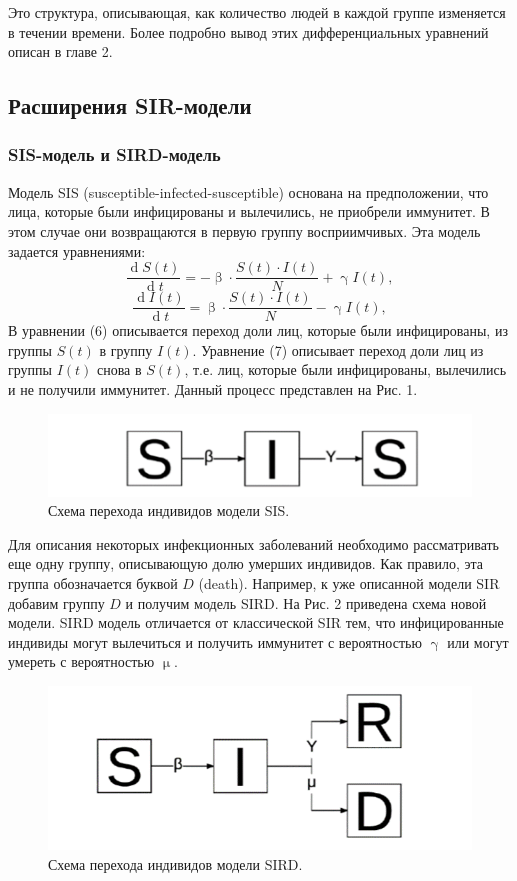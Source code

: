 \documentclass[a4paper, 12pt]{extarticle}
\numberwithin{equation}{section}
\renewcommand{\beta}{\upbeta}
\renewcommand{\gamma}{\upgamma}
\renewcommand{\mu}{\upmu}
\renewcommand{\d}{\operatorname{d}}
\begin{document}
	Это структура, описывающая, как количество людей в каждой группе изменяется в течении времени. Более подробно вывод этих дифференциальных уравнений описан в главе 2.
	\subsection{Расширения SIR-модели}
	\subsubsection{SIS-модель и SIRD-модель}
	Модель SIS (susceptible-infected-susceptible) основана на предположении, что лица, которые были инфицированы и вылечились, не приобрели
	иммунитет. В этом случае они возвращаются в первую группу восприимчивых. Эта модель задается уравнениями:
	\begin{equation}
		\dfrac{\d S(t)}{\d t} = - \beta\cdot  \dfrac{S(t)\cdot I(t)}{N} + \gamma I(t),
	\end{equation}
	\begin{equation}
		\dfrac{\d I(t)}{\d t} = \beta\cdot  \dfrac{S(t)\cdot I(t)}{N} - \gamma I(t),
	\end{equation}
	В уравнении (6) описывается переход доли лиц, которые были инфицированы, из группы $S(t)$ в группу $I(t)$. Уравнение (7) описывает переход
	доли лиц из группы $I(t)$ снова в $S(t)$, т.е. лиц, которые были инфицированы, вылечились и не получили иммунитет. Данный процесс представлен на Рис. 1.
	\begin{figure}[h]
		\centering
		\includegraphics[scale=0.5]{images/img02}
		\caption{Схема перехода индивидов модели SIS.}
		\label{fig:img02}
	\end{figure}
	Для описания некоторых инфекционных заболеваний необходимо рассматривать еще одну группу, описывающую долю умерших индивидов. Как правило, эта группа обозначается буквой $D$ (death). Например, к уже описанной модели SIR добавим группу $D$ и получим модель SIRD. На Рис. 2
	приведена схема новой модели. SIRD модель отличается от классической SIR тем, что инфицированные индивиды могут вылечиться и получить иммунитет с вероятностью $\gamma$ или могут умереть с вероятностью $\mu$.
	\begin{figure}[h]
		\centering
		\includegraphics[scale=0.5]{images/img03}
		\caption{Схема перехода индивидов модели SIRD.}
		\label{fig:img03}
	\end{figure}
	
\end{document}
